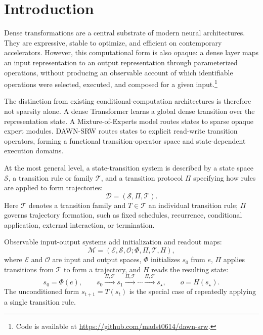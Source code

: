 \documentclass{article}
\begin{document}
\section{Introduction}

Dense transformations are a central substrate of modern neural architectures. They are expressive, stable to optimize, and efficient on contemporary accelerators. However, this computational form is also opaque: a dense layer maps an input representation to an output representation through parameterized operations, without producing an observable account of which identifiable operations were selected, executed, and composed for a given input.\footnote{Code is available at \url{https://github.com/madst0614/dawn-srw}.}

The distinction from existing conditional-computation architectures is therefore not sparsity alone. A dense Transformer learns a global dense transition over the representation state. A Mixture-of-Experts model routes states to sparse opaque expert modules. DAWN-SRW routes states to explicit read-write transition operators, forming a functional transition-operator space and state-dependent execution domains.

At the most general level, a state-transition system is described by a state space $\mathcal{S}$, a transition rule or family $\mathcal{T}$, and a transition protocol $\Pi$ specifying how rules are applied to form trajectories:
\begin{equation}
    \mathcal{D}=(\mathcal{S},\Pi,\mathcal{T}).
    \label{eq:intro_state_transition_system}
\end{equation}
Here $\mathcal{T}$ denotes a transition family and $T\in\mathcal{T}$ an individual transition rule; $\Pi$ governs trajectory formation, such as fixed schedules, recurrence, conditional application, external interaction, or termination.

Observable input-output systems add initialization and readout maps:
\begin{equation}
    \mathcal{M}=(\mathcal{E},\mathcal{S},\mathcal{O};\Phi,\Pi,\mathcal{T},H),
    \label{eq:intro_observable_state_transition_system}
\end{equation}
where $\mathcal{E}$ and $\mathcal{O}$ are input and output spaces, $\Phi$ initializes $s_0$ from $e$, $\Pi$ applies transitions from $\mathcal{T}$ to form a trajectory, and $H$ reads the resulting state:
\begin{equation}
    s_0=\Phi(e),\qquad
    s_0 \xrightarrow{\Pi,\mathcal{T}} s_1 \xrightarrow{\Pi,\mathcal{T}} \cdots \xrightarrow{\Pi,\mathcal{T}} s_\star,\qquad
    o=H(s_\star).
    \label{eq:intro_protocol_trajectory}
\end{equation}
The unconditioned form $s_{t+1}=T(s_t)$ is the special case of repeatedly applying a single transition rule.
\end{document}
